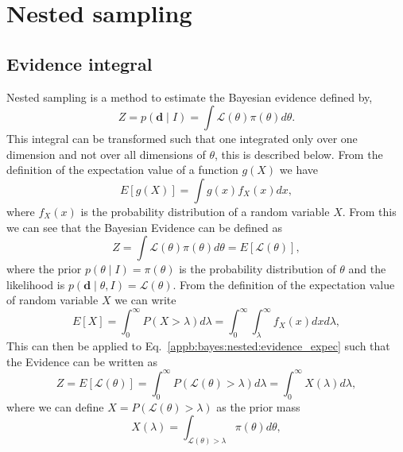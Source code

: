 \chapter{\label{appb} Nested sampling}

\section{Evidence integral}

Nested sampling is a method to estimate the Bayesian evidence defined by,
\begin{equation}
\label{appb:bayes:evidence}
Z = p(\bm{d} \mid I) = \int \mathcal{L}(\theta) \pi(\theta) d\theta.
\end{equation}
This integral can be transformed such that one integrated only over one dimension and not over all dimensions of $\theta$, this is described below.
From the definition of the expectation value of a function $g(X)$ we
have
\begin{equation}
  \label{appb:bayes:nested:exectationg}
  E[ g(X) ] = \int g(x) f_X(x) dx,
\end{equation}
where $f_X(x)$ is the probability distribution of a random variable
$X$.
From this we can see that the Bayesian Evidence can be defined as
\begin{equation}
  \label{appb:bayes:nested:evidence_expec}
  Z = \int \mathcal{L}(\theta) \pi(\theta) d\theta
  = E [ \mathcal{L}(\theta)],
\end{equation}
where the prior $p(\theta \mid I) = \pi(\theta)$ is the probability
distribution of $\theta$ and the likelihood is $p(\bm{d} \mid \theta,
I) = \mathcal{L}(\theta)$.
From the definition of the expectation value of random variable $X$ we
can write
\begin{equation}
  \label{appb:bayes:nested:exectationx}
  E[X] = \int_0^{\infty} P(X > \lambda) d\lambda = \int_0^{\infty}
  \int_{\lambda}^{\infty} f_X(x) dx d\lambda,
\end{equation}
This can then be applied to
Eq.~\ref{appb:bayes:nested:evidence_expec} such that the Evidence
can be written as
\begin{equation}
  \label{appb:bayes:nested:evidence_cumul}
  Z = E[\mathcal{L}(\theta)] = \int_0^{\infty}  P(\mathcal{L}(\theta)
  > \lambda) d\lambda = \int_0^{\infty}  X(\lambda) d\lambda ,
\end{equation}
where we can define $X = P(\mathcal{L}(\theta) > \lambda)$ as the
prior mass
\begin{equation}
  \label{appb:bayes:nested:priormass}
  X(\lambda) = \int_{\mathcal{L}(\theta) > \lambda} \pi(\theta)
  d\theta,
\end{equation}
